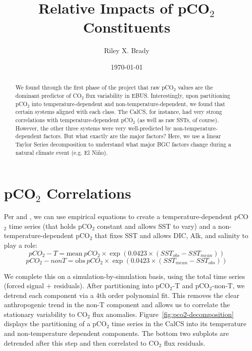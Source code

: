 \documentclass[12pt]{article}
\title{Relative Impacts of pCO$_{2}$ Constituents}
\author{Riley X. Brady}
\date{\today}
\begin{document}
\maketitle
\begin{abstract}
\noindent We found through the first phase of the project that raw pCO$_{2}$ values are the dominant predictor of CO$_{2}$ flux variability in EBUS. Interestingly, upon partitioning pCO$_{2}$ into temperature-dependent and non-temperature-dependent, we found that certain systems aligned with each class. The CalCS, for instance, had very strong correlations with temperature-dependent pCO$_{2}$ (as well as raw SSTs, of course). However, the other three systems were very well-predicted by non-temperature-dependent factors. But what exactly are the major factors? Here, we use a linear Taylor Series decomposition to understand what major BGC factors change during a natural climate event (e.g. El Ni\~no).
\end{abstract}

\newpage
\section{pCO$_{2}$ Correlations}
Per \citet{Takahashi2002} and \citet{Fay2013}, we can use empirical equations to create a temperature-dependent pCO$_{2}$ time series (that holds pCO$_{2}$ constant and allows SST to vary) and a non-temperature-dependent pCO$_{2}$ that fixes SST and allows DIC, Alk, and salinity to play a role:
$$
	pCO_{2}-T = \textrm{mean}~pCO_{2} \times \exp(0.0423 \times (SST_{obs} - SST_{mean}))
$$
$$
	pCO_{2}-nonT = \textrm{obs}~pCO_{2} \times \exp(0.0423 \times (SST_{mean} - SST_{obs}))
$$

We complete this on a simulation-by-simulation basis, using the total time series (forced signal + residuals). After partitioning into pCO$_{2}$-T and pCO$_{2}$-non-T, we detrend each component via a 4th order polynomial fit. This removes the clear anthropogenic trend in the non-T component and allows us to correlate the stationary variability to CO$_{2}$ flux anomalies. Figure~\ref{fig:pco2-decomposition} displays the partitioning of a pCO$_{2}$ time series in the CalCS into its temperature and non-temperature dependent components. The bottom two subplots are detrended after this step and then correlated to CO$_{2}$ flux residuals. \\
\end{document}
